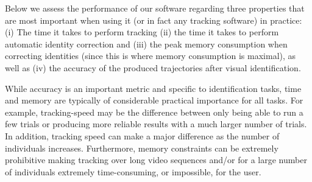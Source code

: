 \documentclass[9pt,lineno]{elife}
\begin{document}
Below we assess the performance {\color{blue}of our software} regarding three properties that are most important when using it (or in fact any tracking software) in practice: (i) The time it takes to perform tracking (ii) the time it takes to perform automatic identity correction and (iii) the peak memory consumption when correcting identities (since this is where memory consumption is maximal), as well as (iv) the accuracy of the produced trajectories after visual identification.


While accuracy is an important metric and specific to identification tasks, time and memory are typically of considerable practical importance for all tasks. For example, tracking-speed may be the difference between only being able to run a few trials or producing more reliable results with a much larger number of trials. In addition, tracking speed can make a major difference as the number of individuals increases. Furthermore, memory constraints can be extremely prohibitive making tracking over long video sequences and/or for a large number of individuals extremely time-consuming, or impossible, for the user.
\end{document}
